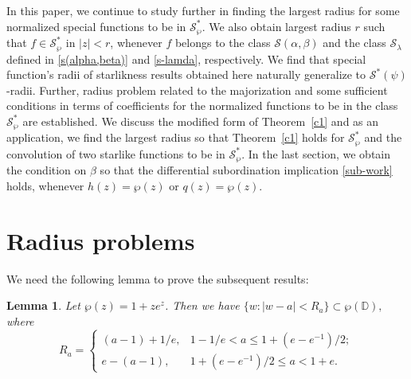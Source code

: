 \documentclass[12pt, reqno]{amsart}
\numberwithin{equation}{section}
\theoremstyle{plain}
\newtheorem{lemma}{Lemma}[section]
\theoremstyle{definition}
\theoremstyle{remark}
\begin{document}
In this paper, we continue to study further in finding the largest radius for some normalized special functions to be in $\mathcal{S}^*_{\wp}$. We also obtain largest radius $r$ such that $f\in \mathcal{S}^*_{\wp}$ in $|z|<r$, whenever $f$ belongs to the class $\mathcal{S}(\alpha,\beta)$ and the class $\mathcal{S}_{\lambda}$ defined in \eqref{s(alpha,beta)} and \eqref{s-lamda}, respectively. We find that special function's radii of starlikness results obtained here naturally generalize to $\mathcal{S}^*(\psi)$-radii. Further, radius problem related to the majorization and some sufficient conditions in terms of coefficients for the normalized functions to be in the class $\mathcal{S}^*_{\wp}$ are established. We discuss the modified form of Theorem~\ref{c1} and as an application, we find the largest radius so that Theorem~\ref{c1} holds for $\mathcal{S}^*_{\wp}$ and the convolution of two starlike functions to be in $\mathcal{S}^*_{\wp}$. In the last section, we obtain the condition on $\beta$ so that the differential subordination implication \eqref{sub-work} holds, whenever $h(z)=\wp(z)$ or $q(z)=\wp(z)$.

\section{Radius problems}
We need the following lemma to prove the subsequent results:
\begin{lemma} \cite{Kumar-cardioid}
	\label{disk_lem}
	Let $\wp(z)=1+ze^z$. Then  we have $\{w : |w-a|<R_a\} \subset \wp(\mathbb{D}),$
	where
	\[  R_a=
	\left\{
	\begin{array}
	{lr}
	(a-1)+{1}/{e}, &  1-{1}/{e}<a\leq1+(e-e^{-1})/{2}; \\
	e-(a-1),   & 1+(e-e^{-1})/{2}\leq a<1+e.
	\end{array}
	\right.
	\]
\end{lemma}
\end{document}
